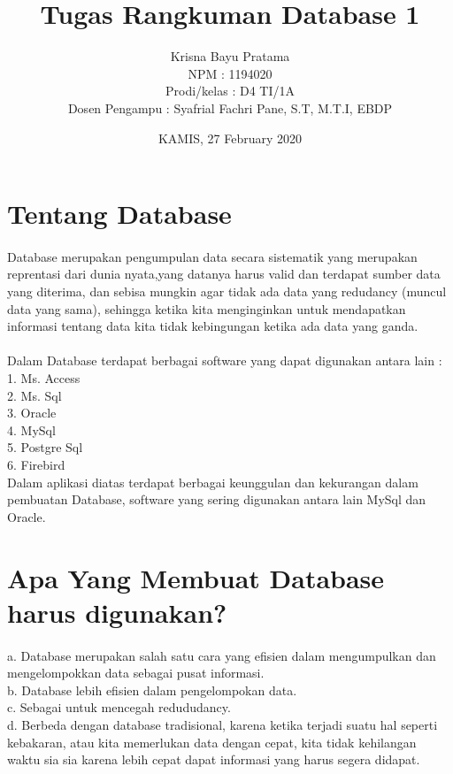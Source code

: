 \documentclass{article}
\title{Tugas Rangkuman Database 1 }
\author{Krisna Bayu Pratama \\ NPM : 1194020 \\ Prodi/kelas : D4 TI/1A \\ Dosen Pengampu : Syafrial Fachri Pane, S.T, M.T.I, EBDP }
\date{KAMIS, 27 February 2020}
\begin{document}
\maketitle

\section{Tentang Database}
\paragraph{}
Database merupakan pengumpulan data secara sistematik yang merupakan reprentasi dari dunia nyata,yang datanya harus valid dan terdapat sumber data yang diterima, dan sebisa mungkin agar tidak ada data yang redudancy (muncul data yang sama), sehingga ketika kita menginginkan untuk mendapatkan informasi tentang data kita tidak kebingungan ketika ada data yang ganda.
\paragraph{}
Dalam Database terdapat berbagai software yang dapat digunakan antara lain : \\
1. Ms. Access \\
2. Ms. Sql\\
3. Oracle\\
4. MySql\\
5. Postgre Sql\\
6. Firebird\\
Dalam aplikasi diatas terdapat berbagai keunggulan dan kekurangan dalam pembuatan Database, software yang sering digunakan antara lain MySql dan Oracle.

\section{Apa Yang Membuat Database harus digunakan?}
\paragraph{}
a. Database merupakan salah satu cara yang efisien dalam mengumpulkan dan mengelompokkan data sebagai pusat informasi.\\
b. Database lebih efisien dalam pengelompokan data.\\
c. Sebagai untuk mencegah redududancy.\\
d. Berbeda dengan database tradisional, karena ketika terjadi suatu hal seperti kebakaran, atau kita memerlukan data dengan cepat, kita tidak kehilangan waktu sia sia karena lebih cepat dapat informasi yang harus segera didapat.
\end{document}
